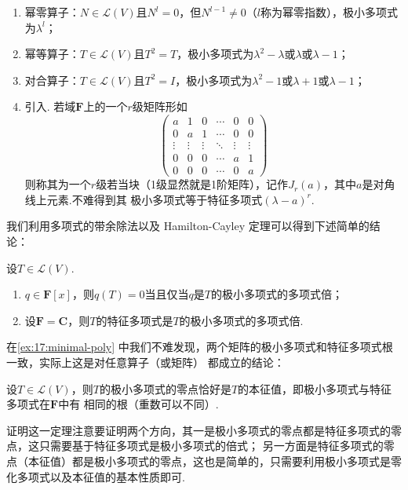 \begin{enumerate}
    \item 幂零算子：$N\in \mathcal{L}(V)$且$N^l=0$，但$N^{l-1}\neq 0$（$l$称为幂零指数），极小多项式为$\lambda^l$；

    \item 幂等算子：$T\in \mathcal{L}(V)$且$T^2=T$，极小多项式为$\lambda^2-\lambda$或$\lambda$或$\lambda-1$；

    \item 对合算子：$T\in \mathcal{L}(V)$且$T^2=I$，极小多项式为$\lambda^2-1$或$\lambda+1$或$\lambda-1$；

    \item 引入. 若域$\mathbf{F}$上的一个$r$级矩阵形如\[\begin{pmatrix}
        a & 1 & 0 & \cdots & 0 & 0 \\
        0 & a & 1 & \cdots & 0 & 0 \\
        \vdots & \vdots & \vdots & \ddots & \vdots & \vdots \\
        0 & 0 & 0 & \cdots & a & 1 \\
        0 & 0 & 0 & \cdots & 0 & a
    \end{pmatrix}\]
    则称其为一个$r$级若当块（1级显然就是1阶矩阵），记作$J_r(a)$，其中$a$是对角线上元素.不难得到其
    极小多项式等于特征多项式$(\lambda-a)^r$.
\end{enumerate}

我们利用多项式的带余除法以及 Hamilton-Cayley 定理可以得到下述简单的结论：
\begin{theorem}
    设$T\in \mathcal{L}(V)$.
    \begin{enumerate}
        \item $q\in\mathbf{F}[x]$，则$q(T)=0$当且仅当$q$是$T$的极小多项式的多项式倍；

        \item 设$\mathbf{F}=\mathbf{C}$，则$T$的特征多项式是$T$的极小多项式的多项式倍.
    \end{enumerate}
\end{theorem}
在\autoref{ex:17:minimal-poly} 中我们不难发现，两个矩阵的极小多项式和特征多项式根一致，实际上这是对任意算子（或矩阵）
都成立的结论：
\begin{theorem} \label{min-chr-same-root} %
    设$T\in \mathcal{L}(V)$，则$T$的极小多项式的零点恰好是$T$的本征值，即极小多项式与特征多项式在$\mathbf{F}$中有
    相同的根（重数可以不同）.
\end{theorem}
证明这一定理注意要证明两个方向，其一是极小多项式的零点都是特征多项式的零点，这只需要基于特征多项式是极小多项式的倍式；
另一方面是特征多项式的零点（本征值）都是极小多项式的零点，这也是简单的，只需要利用极小多项式是零化多项式以及本征值的基本性质即可.

